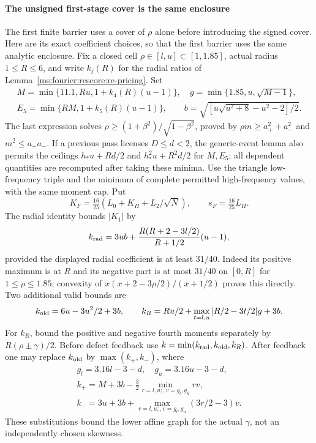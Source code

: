 \paragraph{The unsigned first-stage cover is the same enclosure}
\label{ms:fourier:rescore:re-unsigned}
The first finite barrier uses a cover of $\rho$ alone before introducing
the signed cover. Here are its exact coefficient choices, so that the
first barrier uses the same analytic enclosure. Fix a closed
cell $\rho\in[l,u]\subset[1,1.85]$, actual radius $1\le R\le6$, and
write $k_j(R)$ for the radial ratios of Lemma~\ref{ms:fourier:rescore:re-pricing}. Set
\begin{gather*}
 M=\min\{11.1,Ru,1+k_4(R)(u-1)\},\quad
 g=\min\{1.85,u,\sqrt{M-1}\},\\
 E_5=\min\{RM,1+k_5(R)(u-1)\},\qquad
 b=\sqrt{[u\sqrt{u^2+8}-u^2-2]/2}.
\end{gather*}
The last expression solves $\rho\ge(1+\beta^2)/\sqrt{1-\beta^2}$,
proved by $\rho m\ge a_+^2+a_-^2$ and $m^2\le a_+a_-$.
If a previous pass licenses $D\le d<2$, the generic-event lemma also
permits the ceilings $h_*u+Rd/2$ and $h_*^2u+R^2d/2$ for $M,E_5$;
all dependent quantities are recomputed after taking these minima.
Use the triangle low-frequency triple and the minimum of complete permitted high-frequency
values, with the same moment cap. Put
\[
 K_F=\tfrac{16}{25}(L_0+K_H+L_2/\sqrt N),\qquad s_F=\tfrac{16}{25}L_H.
\]
The radial identity bounds $|K_1|$ by
\[
 k_{\rm rad}=3ub+
     \frac{R(R+2-3l/2)}{R+1/2}(u-1),
\]
provided the displayed radial coefficient is at least $31/40$.
Indeed its positive maximum is at $R$ and its negative part is at most
$31/40$ on $[0,R]$ for $1\le\rho\le1.85$; convexity of
$x(x+2-3\rho/2)/(x+1/2)$ proves this directly.
Two additional valid bounds are
\[
 k_{\rm old}=6u-3u^2/2+3b,\qquad
 k_R=Ru/2+\max_{t=l,u}|R/2-3t/2|g+3b.
\]
For $k_R$, bound the positive and negative fourth moments separately by
$R(\rho\pm\gamma)/2$. Before defect feedback use
$k=\min(k_{\rm rad},k_{\rm old},k_R)$.
After feedback one may replace $k_{\rm old}$ by $\max(k_+,k_-)$, where
\begin{gather*}
 g_l=3.16l-3-d,\quad g_u=3.16u-3-d,\\
 k_+=M+3b-\tfrac32\min_{r=l,u;,v=g_l,g_u}rv,\\
 k_-=3u+3b+\max_{r=l,u;,v=g_l,g_u}(3r/2-3)v.
\end{gather*}
These substitutions bound the lower affine graph for the actual $\gamma$,
not an independently chosen skewness.

